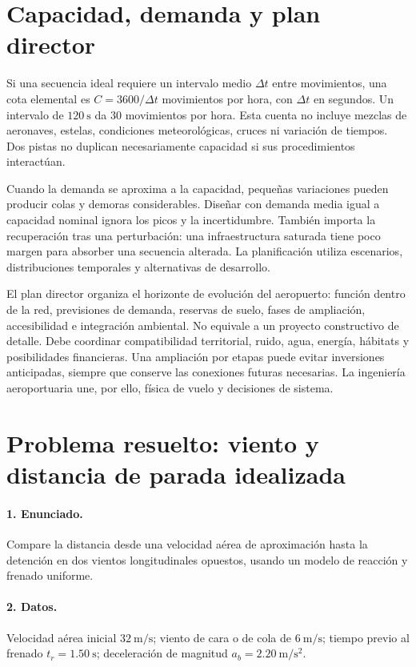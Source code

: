 \section{Capacidad, demanda y plan director}
Si una secuencia ideal requiere un intervalo medio $\Delta t$ entre movimientos, una cota elemental es $C=3600/\Delta t$ movimientos por hora, con $\Delta t$ en segundos. Un intervalo de $120\ \mathrm s$ da $30$ movimientos por hora. Esta cuenta no incluye mezclas de aeronaves, estelas, condiciones meteorológicas, cruces ni variación de tiempos. Dos pistas no duplican necesariamente capacidad si sus procedimientos interactúan.

Cuando la demanda se aproxima a la capacidad, pequeñas variaciones pueden producir colas y demoras considerables. Diseñar con demanda media igual a capacidad nominal ignora los picos y la incertidumbre. También importa la recuperación tras una perturbación: una infraestructura saturada tiene poco margen para absorber una secuencia alterada. La planificación utiliza escenarios, distribuciones temporales y alternativas de desarrollo.

El plan director organiza el horizonte de evolución del aeropuerto: función dentro de la red, previsiones de demanda, reservas de suelo, fases de ampliación, accesibilidad e integración ambiental. No equivale a un proyecto constructivo de detalle. Debe coordinar compatibilidad territorial, ruido, agua, energía, hábitats y posibilidades financieras. Una ampliación por etapas puede evitar inversiones anticipadas, siempre que conserve las conexiones futuras necesarias. La ingeniería aeroportuaria une, por ello, física de vuelo y decisiones de sistema.

\section{Problema resuelto: viento y distancia de parada idealizada}
\paragraph{1. Enunciado.} Compare la distancia desde una velocidad aérea de aproximación hasta la detención en dos vientos longitudinales opuestos, usando un modelo de reacción y frenado uniforme.
\paragraph{2. Datos.} Velocidad aérea inicial $32\ \mathrm{m/s}$; viento de cara o de cola de $6\ \mathrm{m/s}$; tiempo previo al frenado $t_r=1.50\ \mathrm s$; deceleración de magnitud $a_b=2.20\ \mathrm{m/s^2}$.
